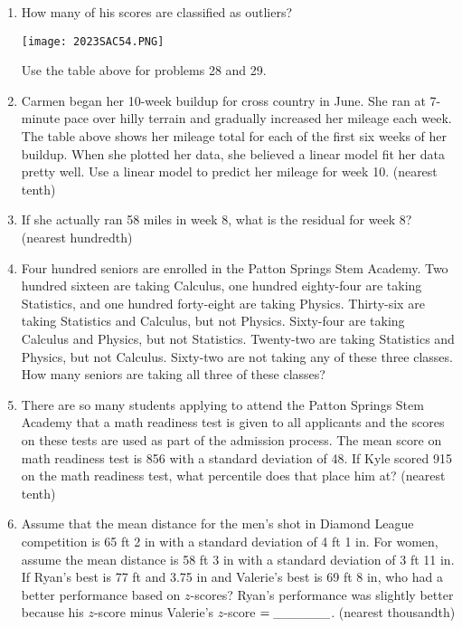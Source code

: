 \documentclass[../uilmath.tex]{subfiles}
\begin{document}
\begin{enumerate}[label=\bfseries\arabic*.]
    \item %
    How many of his scores are classified as outliers?


    \begin{center}
        \texttt{[image: 2023SAC54.PNG]}
    \end{center}
    Use the table above for problems 28 and 29.
    \item %
    Carmen began her 10-week buildup for cross country in June. She ran at 7-minute pace over hilly terrain and gradually increased her mileage each week. The table above shows her mileage 
    total for each of the first six weeks of her buildup. When she plotted her data, she believed a linear model fit her data pretty well. Use a linear model to predict her mileage for week 10. (nearest tenth)

    \item %
    If she actually ran 58 miles in week 8, what is the residual for week 8? (nearest hundredth)

    \item %
    Four hundred seniors are enrolled in the Patton Springs Stem Academy. Two hundred sixteen are taking Calculus, one hundred eighty-four are taking Statistics, 
    and one hundred forty-eight are taking Physics. Thirty-six are taking Statistics and Calculus, but not Physics. Sixty-four are taking Calculus and Physics, but not Statistics.
    Twenty-two are taking Statistics and Physics, but not Calculus. Sixty-two are not taking any of these three classes. How many seniors are taking all three of these classes?

    \item %
    There are so many students applying to attend the Patton Springs Stem Academy that a math readiness test is given to all applicants and the scores 
    on these tests are used as part of the admission process. The mean score on math readiness test is 856 with a standard deviation of 48. If Kyle scored 915 on the math readiness test, what percentile does that place him at? (nearest tenth)

    \item %
    Assume that the mean distance for the men's shot in Diamond League competition is 65 ft 2 in with a standard deviation of 4 ft 1 in. For women, 
    assume the mean distance is 58 ft 3 in with a standard deviation of 3 ft 11 in. If Ryan's best is 77 ft and 3.75 in and Valerie's best is 69 ft 8 in, who had a better performance 
    based on $z$-scores? Ryan's performance was slightly better because his $z$-score minus Valerie's $z$-score $=\_\_\_\_\_\_$. (nearest thousandth)



\end{enumerate}
\end{document}

